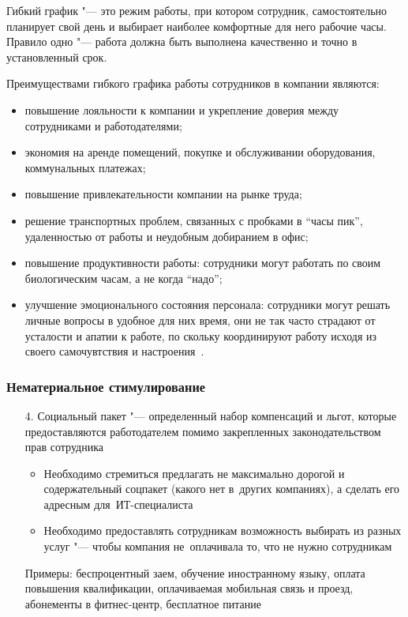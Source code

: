 \documentclass{../industrial-development}
\begin{document}
\lecturenotes
		
Гибкий график "--- это режим работы, при котором сотрудник, самостоятельно планирует свой день и выбирает наиболее комфортные для него рабочие часы. Правило одно "--- работа должна быть выполнена качественно и точно в установленный срок.
		
	Преимуществами гибкого графика работы сотрудников в компании являются:
 \begin{itemize}
\item повышение лояльности к компании и укрепление доверия между сотрудниками и работодателями;
\item экономия на аренде помещений, покупке и обслуживании оборудования, коммунальных платежах;
\item повышение привлекательности компании на рынке труда;
\item решение транспортных проблем, связанных с пробками в “часы пик”, удаленностью от работы и неудобным добиранием в офис;
\item повышение продуктивности работы: сотрудники могут работать по своим биологическим часам, а не когда “надо”;
\item улучшение эмоционального состояния персонала: сотрудники могут решать личные вопросы в удобное для них время, они не так часто страдают от усталости и апатии к работе, по скольку координируют работу исходя из своего самочувтствия и настроения~\cite{Shabarshina}.
 \end{itemize}

\begin{frame} \frametitle{Нематериальное стимулирование}
	\begin{itemize}
	\item[4.] \alert{Социальный пакет} "--- определенный набор компенсаций и льгот, которые предоставляются работодателем помимо закрепленных законодательством прав сотрудника
	\begin{itemize}
	\item Необходимо стремиться предлагать не максимально дорогой и содержательный соцпакет (какого нет в~других компаниях), а сделать его адресным для~ИТ-специалиста
	\item Необходимо предоставлять сотрудникам возможность выбирать из разных услуг "--- чтобы компания не~оплачивала то, что не нужно сотрудникам
	 \end{itemize}
Примеры: беспроцентный заем, обучение иностранному языку, оплата повышения квалификации, оплачиваемая мобильная связь и проезд, абонементы в фитнес-центр, бесплатное питание
  \end{itemize}
\end{frame}
		
\end{document}
